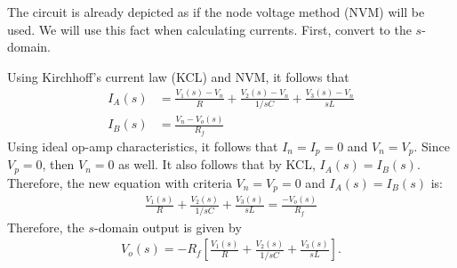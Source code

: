 \documentclass{report}
\begin{document}
\begin{solution}
    The circuit is already depicted as if the node voltage method (NVM) will be used. We will use this fact when calculating currents. First, convert to the $s$-domain.
    \begin{center}
    \end{center}
    Using Kirchhoff's current law (KCL) and NVM, it follows that 
    \begin{align*}
        I_A(s) &= \frac{V_1(s)-V_n}{R} + \frac{V_2(s)-V_n}{1/sC} + \frac{V_3(s)-V_n}{sL} \\
        I_B(s) &= \frac{V_n-V_o(s)}{R_f}
    \end{align*}
    Using ideal op-amp characteristics, it follows that $I_n=I_p=0$ and $V_n=V_p$. Since $V_p=0$, then $V_n=0$ as well. It also follows that by KCL, $I_A(s)=I_B(s)$. Therefore, 
    the new equation with criteria $V_n=V_p=0$ and $I_A(s)=I_B(s)$ is:
    \begin{align*}
        \frac{V_1(s)}{R} + \frac{V_2(s)}{1/sC} + \frac{V_3(s)}{sL} = \frac{-V_o(s)}{R_f}
    \end{align*}
    Therefore, the $s$-domain output is given by 
    \begin{align*}
        V_o(s) = -R_f\left[\frac{V_1(s)}{R} + \frac{V_2(s)}{1/sC} + \frac{V_3(s)}{sL}\right].
    \end{align*}
\end{solution}
\end{document}
